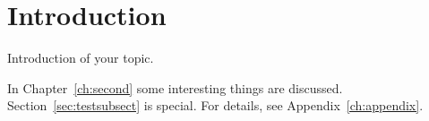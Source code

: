 \chapter{Introduction}
\label{ch:intro}

\noindent
Introduction of your topic.

In Chapter~\ref{ch:second} some interesting things are discussed. Section~\ref{sec:testsubsect} is special. For details, see Appendix~\ref{ch:appendix}.

